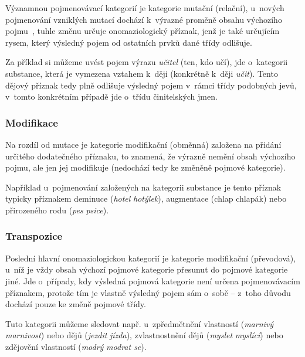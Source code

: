Významnou pojmenovávací kategorií je kategorie mutační (relační),
u~nových pojmenování vzniklých mutací dochází k~výrazné proměně obsahu
výchozího pojmu~\parencite[102]{dokulil00}, tuhle změnu určuje
onomaziologický příznak, jenž je také určujícím rysem, který výsledný
pojem od ostatních prvků dané třídy odlišuje.~\parencite{enc-mutace17}

Za příklad si můžeme uvést pojem výrazu \emph{učitel} (ten, kdo učí),
jde o~kategorii substance, která je vymezena vztahem k~ději (konkrétně
k~ději \emph{učit}). Tento dějový příznak tedy plně odlišuje výsledný
pojem v~rámci třídy podobných jevů, v~tomto konkrétním případě jde
o~třídu činitelských jmen.

\hypertarget{modifikace}{%
\subsubsection{Modifikace}\label{modifikace}}

Na rozdíl od mutace je kategorie modifikační (obměnná) založena na
přidání určitého dodatečného příznaku, to znamená, že výrazně nemění
obsah výchozího pojmu, ale jen jej modifikuje (nedochází tedy ke změněně
pojmové kategorie).~\parencite[102]{dokulil00}

Například u~pojmenování založených na kategorii substance je tento
příznak typicky příznakem deminuce (\emph{hotel} \rigtharrow
\emph{hotýlek}), augmentace (chlap \rigtharrow chlapák) nebo
přirozeného rodu (\emph{pes} \rigtharrow \emph{psice}).

\hypertarget{transpozice}{%
\subsubsection{Transpozice}\label{transpozice}}

Poslední hlavní onomaziologickou kategorií je kategorie modifikační
(převodová), u~níž je vždy obsah výchozí pojmové kategorie přesunut do
pojmové kategorie jiné. Jde o~případy, kdy výsledná pojmová kategorie
není určena pojmenovávacím příznakem, protože tím je vlastně výsledný
pojem sám o~sobě -- z~toho důvodu dochází pouze ke změně pojmové třídy.
\parencite[103]{dokulil00}

Tuto kategorii můžeme sledovat např. u~zpředmětnění vlastností
(\emph{marnivý} \rigtharrow \emph{marnivost}) nebo dějů
(\emph{jezdit} \rigtharrow \emph{jízda}), zvlastnostnění dějů
(\emph{myslet} \rigtharrow \emph{myslící}) nebo zdějovění
vlastností (\emph{modrý} \rigtharrow \emph{modrat se}).

